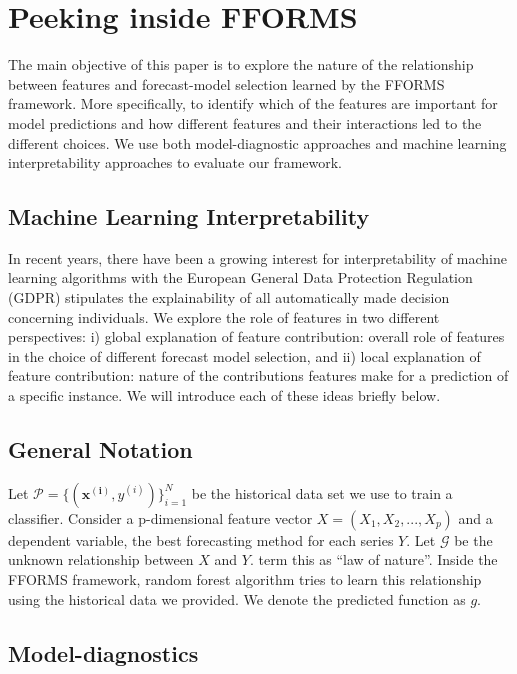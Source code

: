 \documentclass[11pt,a4paper,]{article}
\begin{document}
\section{Peeking inside FFORMS}\label{machinelearning}

The main objective of this paper is to explore the nature of the
relationship between features and forecast-model selection learned by
the FFORMS framework. More specifically, to identify which of the
features are important for model predictions and how different features
and their interactions led to the different choices. We use both
model-diagnostic approaches and machine learning interpretability
approaches to evaluate our framework.

\subsection{Machine Learning
Interpretability}\label{machine-learning-interpretability}

In recent years, there have been a growing interest for interpretability
of machine learning algorithms with the European General Data Protection
Regulation (GDPR) stipulates the explainability of all automatically
made decision concerning individuals. We explore the role of features in
two different perspectives: i) global explanation of feature
contribution: overall role of features in the choice of different
forecast model selection, and ii) local explanation of feature
contribution: nature of the contributions features make for a prediction
of a specific instance. We will introduce each of these ideas briefly
below.

\subsection{General Notation}\label{general-notation}

Let \(\mathcal{P}=\{(\mathbf{x^{(i)}}, y^{(i)})\}_{i=1}^{N}\) be the
historical data set we use to train a classifier. Consider a
p-dimensional feature vector \(X=(X_1, X_2, ..., X_p)\) and a dependent
variable, the best forecasting method for each series \(Y\). Let
\(\mathcal{G}\) be the unknown relationship between \(X\) and \(Y\).
\textcite{Zhao} term this as ``law of nature''. Inside the FFORMS
framework, random forest algorithm tries to learn this relationship
using the historical data we provided. We denote the predicted function
as \(g\).

\subsection{Model-diagnostics}\label{model-diagnostics}
\end{document}
